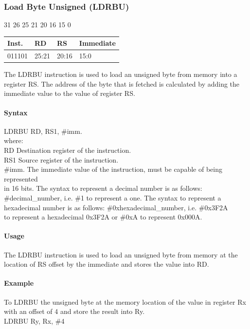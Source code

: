 \documentclass[12pt]{article}
\newcommand{\iTypeInstruction}[6]
{%
    \hspace{1.6cm}31 \hspace{1.15cm}26 \hspace{.05cm}25 \hspace{.8cm}21 \hspace{.05cm}20 \hspace{.8cm}16 \hspace{.05cm}15 \hspace{6.4cm}0
    \vspace{-.25cm}
    \begin{center}
        \begin{tabular}{ |p{1.8cm}|p{1.5cm}|p{1.5cm}|p{6.8cm}| }
            \hline
            \textbf{Inst.} & \textbf{RD} &  \textbf{RS} & \textbf{Immediate}\\
            \hline
            #1 & 25:21 & 20:16 &15:0\\
            \hline
        \end{tabular}
    \end{center}
    
    \noindent
    #2
    
    \paragraph{Syntax}
    \begin{flushleft}
    #3 RD, RS1, \#imm.\\
    \vspace{1em}        %
    where:\\
    \vspace{1em}
    RD  \hspace{3.6em} Destination register of the instruction.\\
    \vspace{1em}
    RS1  \hspace{3.35em} Source register of the instruction.\\
    \vspace{1em}
    \#imm.  \hspace{1.8em} The immediate value of the instruction, must be capable of being represented\\             \hspace{5.4em} in 16 bits. The syntax to represent a decimal number is as follows:\\
            \hspace{5.4em} \#decimal\_number, i.e. \#1 to represent a one. The syntax to represent a\\
            \hspace{5.4em} hexadecimal number is as follows: \#0xhexadecimal\_number, i.e. \#0x3F2A \\
            \hspace{5.4em} to represent a hexadecimal 0x3F2A or \#0xA to represent 0x000A.\\
    \end{flushleft}
    
    \paragraph{Usage}
    \begin{flushleft}
    #4\\
    \end{flushleft}
    \paragraph{Example}
    \begin{flushleft}
    #5\\
    \vspace{1em}
    #6
    \end{flushleft}}
\begin{document}

    \newpage
    \subsubsection{Load Byte Unsigned (LDRBU)}
    
    \iTypeInstruction
    {011101}
    {The LDRBU instruction is used to load an unsigned byte from memory into a register RS. The address of the byte that is fetched is calculated by adding the immediate value to the value of register RS.}
    {LDRBU}
    {The LDRBU instruction is used to load an unsigned byte from memory at the location of RS offset by the immediate and stores the value into RD.}
    {To LDRBU the unsigned byte at the memory location of the value in register Rx with an offset of 4 and store the result into Ry.}
    {LDRBU Ry, Rx, \#4}
    
    
    
\end{document}
